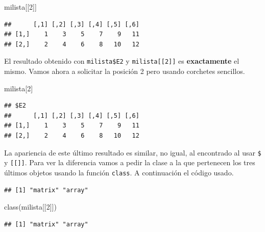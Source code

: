 \documentclass[
]{book}
\makeatletter
\newenvironment{Shaded}{\begin{snugshade}}{\end{snugshade}}
\newcommand{\DecValTok}[1]{\textcolor[rgb]{0.00,0.00,0.81}{#1}}
\newcommand{\FunctionTok}[1]{\textcolor[rgb]{0.00,0.00,0.00}{#1}}
\newcommand{\NormalTok}[1]{#1}
\newcommand{\SpecialCharTok}[1]{\textcolor[rgb]{0.00,0.00,0.00}{#1}}
\newenvironment{kframe}{%
\medskip{}
\setlength{\fboxsep}{.8em}
 \def\at@end@of@kframe{}%
 \ifinner\ifhmode%
  \def\at@end@of@kframe{\end{minipage}}%
  \begin{minipage}{\columnwidth}%
 \fi\fi%
 \def\FrameCommand##1{\hskip\@totalleftmargin \hskip-\fboxsep
 \colorbox{shadecolor}{##1}\hskip-\fboxsep
     \hskip-\linewidth \hskip-\@totalleftmargin \hskip\columnwidth}%
 \MakeFramed {\advance\hsize-\width
   \@totalleftmargin\z@ \linewidth\hsize
   \@setminipage}}%
 {\par\unskip\endMakeFramed%
 \at@end@of@kframe}
\renewenvironment{Shaded}{\begin{kframe}}{\end{kframe}}
\makeatother
\begin{document}
\begin{Shaded}
\begin{Highlighting}[]
\NormalTok{milista[[}\DecValTok{2}\NormalTok{]]}
\end{Highlighting}
\end{Shaded}

\begin{verbatim}
##      [,1] [,2] [,3] [,4] [,5] [,6]
## [1,]    1    3    5    7    9   11
## [2,]    2    4    6    8   10   12
\end{verbatim}

El resultado obtenido con \texttt{milista\$E2} y \texttt{milista{[}{[}2{]}{]}} es \textbf{exactamente} el mismo. Vamos ahora a solicitar la posición 2 pero usando corchetes sencillos.

\begin{Shaded}
\begin{Highlighting}[]
\NormalTok{milista[}\DecValTok{2}\NormalTok{]}
\end{Highlighting}
\end{Shaded}

\begin{verbatim}
## $E2
##      [,1] [,2] [,3] [,4] [,5] [,6]
## [1,]    1    3    5    7    9   11
## [2,]    2    4    6    8   10   12
\end{verbatim}

La apariencia de este último resultado es similar, no igual, al encontrado al usar \texttt{\$} y \texttt{{[}{[}{]}{]}}. Para ver la diferencia vamos a pedir la clase a la que pertenecen los tres últimos objetos usando la función \texttt{class}. A continuación el código usado.

\begin{Shaded}
\end{Shaded}

\begin{verbatim}
## [1] "matrix" "array"
\end{verbatim}

\begin{Shaded}
\begin{Highlighting}[]
\FunctionTok{class}\NormalTok{(milista[[}\DecValTok{2}\NormalTok{]])}
\end{Highlighting}
\end{Shaded}

\begin{verbatim}
## [1] "matrix" "array"
\end{verbatim}
\end{document}
